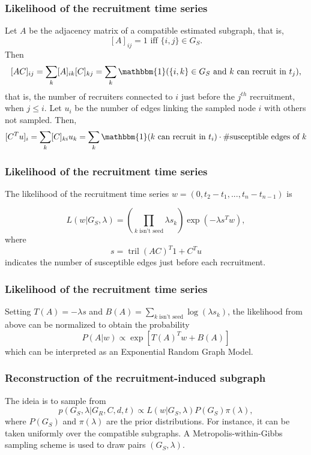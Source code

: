 \documentclass{beamer}
\begin{document}
\begin{frame}
  
  \frametitle{Likelihood of the recruitment time series}

  Let $A$ be the adjacency matrix of a compatible estimated subgraph, that is,
  $$
  [A]_{ij} = 1 \text{ iff } \{i,j\} \in G_S.
  $$
  Then 
  $$
  [AC]_{ij} = \sum_{k} [A]_{ik}[C]_{kj} = \sum_{k} \mathbbm{1}(\{i,k\} \in G_S \text{ and } k \text{ can recruit in } t_j),  
  $$
  that is, the number of recruiters connected to $i$ just before the $j^{th}$
  recruitment, when $j \le i$. Let $u_i$ be the number of edges linking the
  sampled node $i$ with others not sampled. Then, 
  $$
  [C^T u]_{i} = \sum_{k} [C]_{ki} u_k  = \sum_k \mathbbm{1}(k \text{ can recruit in } t_i)\cdot \#\text{susceptible edges of }k 
  $$

\end{frame}

\begin{frame}
  \frametitle{Likelihood of the recruitment time series}

  The likelihood of the recruitment time series $w = (0, t_2 - t_1, ..., t_n -
  t_{n-1})$ is 

  $$
  L(w| G_S, \lambda) = \left(\prod_{k \text{ isn't seed}} \lambda s_k\right) \exp(-\lambda s^Tw), 
  $$
  where 
  $$
  s = \operatorname{tril}(AC)^T 1 + C^Tu 
  $$
  indicates the number of susceptible edges just before each recruitment.

\end{frame}

\begin{frame}
  \frametitle{Likelihood of the recruitment time series}

  Setting $T(A) = -\lambda s$ and $B(A) = \sum_{k \text{ isn't seed}}
  \log(\lambda s_k)$, the likelihood from above can be normalized to obtain
  the probability 
  $$
  P(A|w) \propto \exp\left[T(A)^Tw + B(A)\right]
  $$
  which can be interpreted as an Exponential Random Graph Model. 
\end{frame}

\begin{frame}
  \frametitle{Reconstruction of the recruitment-induced subgraph}

  The ideia is to sample from 
  $$
  p(G_S, \lambda | G_R,C,d,t) \propto L(w|G_S, \lambda) P(G_S)\pi(\lambda), 
  $$
  where $P(G_S)$ and $\pi(\lambda)$ are the prior distributions. For instance,
  it can be taken uniformly over the compatible subgraphs. A
  Metropolis-within-Gibbs sampling scheme is used to draw pairs $(G_S,
  \lambda)$. 

\end{frame}
  
\end{document}
